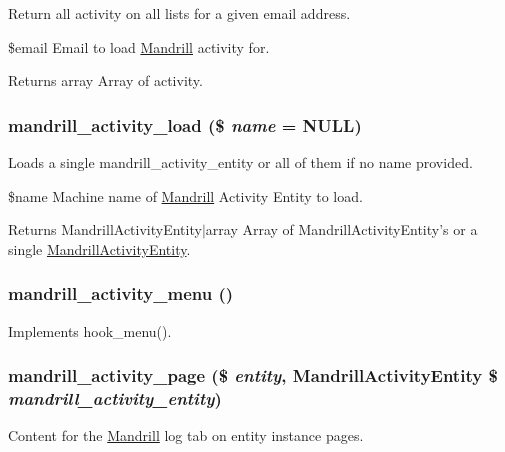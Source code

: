 \label{mandrill__activity_8module_a9703602184d50379b683cb3d63e8bf85}
Return all activity on all lists for a given email address.

\$email Email to load \hyperlink{classMandrill}{Mandrill} activity for.

\begin{DoxyReturn}{Returns}
array Array of activity. 
\end{DoxyReturn}
\hypertarget{mandrill__activity_8module_afa5dcbb883ef346e89f389138d82dda5}{
\subsubsection[{mandrill\_\-activity\_\-load}]{\setlength{\rightskip}{0pt plus 5cm}mandrill\_\-activity\_\-load (\$ {\em name} = {\ttfamily NULL})}}
\label{mandrill__activity_8module_afa5dcbb883ef346e89f389138d82dda5}
Loads a single mandrill\_\-activity\_\-entity or all of them if no name provided.

\$name Machine name of \hyperlink{classMandrill}{Mandrill} Activity Entity to load.

\begin{DoxyReturn}{Returns}
MandrillActivityEntity$|$array Array of MandrillActivityEntity's or a single \hyperlink{classMandrillActivityEntity}{MandrillActivityEntity}. 
\end{DoxyReturn}
\hypertarget{mandrill__activity_8module_a2967e85bba4a823650a30286878d62ea}{
\subsubsection[{mandrill\_\-activity\_\-menu}]{\setlength{\rightskip}{0pt plus 5cm}mandrill\_\-activity\_\-menu ()}}
\label{mandrill__activity_8module_a2967e85bba4a823650a30286878d62ea}
Implements hook\_\-menu(). \hypertarget{mandrill__activity_8module_a7f19a71b20f386a718df03a81e614c5b}{
\subsubsection[{mandrill\_\-activity\_\-page}]{\setlength{\rightskip}{0pt plus 5cm}mandrill\_\-activity\_\-page (\$ {\em entity}, \/  {\bf MandrillActivityEntity} \$ {\em mandrill\_\-activity\_\-entity})}}
\label{mandrill__activity_8module_a7f19a71b20f386a718df03a81e614c5b}
Content for the \hyperlink{classMandrill}{Mandrill} log tab on entity instance pages.

